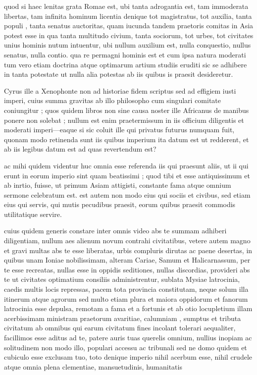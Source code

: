  quod si haec lenitas grata Romae est, ubi tanta adrogantia est, tam immoderata libertas, tam infinita hominum licentia denique tot magistratus, tot auxilia, tanta populi , tanta senatus auctoritas, quam iucunda tandem praetoris comitas in Asia potest esse in qua tanta multitudo civium, tanta sociorum, tot urbes, tot civitates unius hominis nutum intuentur, ubi nullum auxilium est, nulla conquestio, nullus senatus, nulla contio. qua re permagni hominis est et cum ipsa natura moderati tum vero etiam doctrina atque optimarum artium studiis eruditi sic se adhibere in tanta potestate ut nulla alia potestas ab iis quibus is praesit desideretur.

 Cyrus ille a Xenophonte non ad historiae fidem scriptus sed ad effigiem iusti imperi, cuius summa gravitas ab illo philosopho cum singulari comitate coniungitur ; quos quidem libros non sine causa noster ille Africanus de manibus ponere non solebat ; nullum est enim praetermissum in iis officium diligentis et moderati imperi—eaque si sic coluit ille qui privatus futurus numquam fuit, quonam modo retinenda sunt iis quibus imperium ita datum est ut redderent, et ab iis legibus datum est ad quas revertendum est?

 ac mihi quidem videntur huc omnia esse referenda iis qui praesunt aliis, ut ii qui erunt in eorum imperio sint quam beatissimi ; quod tibi et esse antiquissimum et ab inrtio, fuisse, ut primum Asiam attigisti, constante fama atque omnium sermone celebratum est. est autem non modo eius qui sociis et civibus, sed etiam eius qui servis, qui mutis pecudibus praesit, eorum quibus praesit commodis utilitatique servire.

 cuius quidem generis constare inter omnis video abs te summam adhiberi diligentiam, nullum aes alienum novum contrahi civitatibus, vetere autem magno et gravi multas abs te esse liberatas, urbis compluris dirutas ac paene desertas, in quibus unam Ioniae nobilissimam, alteram Cariae, Samum et Halicarnassum, per te esse recreatas, nullas esse in oppidis seditiones, nullas discordias, provideri abs te ut civitates optimatium consiliis administrentur, sublata Mysiae latrocinia, caedis multis locis repressas, pacem tota provincia constitutam, neque solum illa itinerum atque agrorum sed multo etiam plura et maiora oppidorum et fanorum latrocinia esse depulsa, remotam a fama et a fortunis et ab otio locupletium illam acerbissimam ministram praetorum avaritiae, calumniam , sumptus et tributa civitatum ab omnibus qui earum civitatum fines incolant tolerari aequaliter, facillimos esse aditus ad te, patere auris tuas querelis omnium, nullius inopiam ac solitudinem non modo illo, populari accessu ac tribunali sed ne domo quidem et cubiculo esse exclusam tuo, toto denique imperio nihil acerbum esse, nihil crudele atque omnia plena clementiae, mansuetudinis, humanitatis

